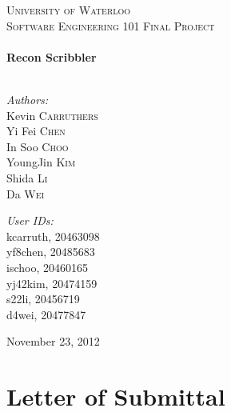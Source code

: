 \documentclass[12pt]{article}
\begin{document}
\begin{titlepage}
\begin{center}
\textsc{\LARGE University of Waterloo}\\[1.5cm]
\textsc{\Large Software Engineering 101 Final Project}\\[0.5cm]

\HRule \\[0.4cm]
{\huge \bfseries Recon Scribbler}\\
\HRule \\[1.5cm]

\begin{minipage}{0.4\textwidth}
\begin{flushleft} \large
\emph{Authors:}\\
Kevin \textsc{Carruthers}\\
Yi Fei \textsc{Chen}\\
In Soo \textsc{Choo}\\
YoungJin \textsc{Kim}\\
Shida \textsc{Li}\\
Da \textsc{Wei}
\end{flushleft}
\end{minipage}
\begin{minipage}{0.4\textwidth}
\begin{flushright} \large
\emph{User IDs:} \\
kcarruth, \textsc{20463098}\\
yf8chen, \textsc{20485683}\\
ischoo, \textsc{20460165}\\
yj42kim, \textsc{20474159}\\
s22li, \textsc{20456719}\\
d4wei, \textsc{20477847}
\end{flushright}
\end{minipage}

\vfill
{\large November 23, 2012}
\end{center}
\end{titlepage}

\section*{\fontsize{16}{16}\textsf{Letter of Submittal}}
\onehalfspacing
\thispagestyle{empty}


\newpage

\tableofcontents\newpage
\listoffigures
{}
\newpage
\listoftables
{}
\newpage
{}
\end{document}
